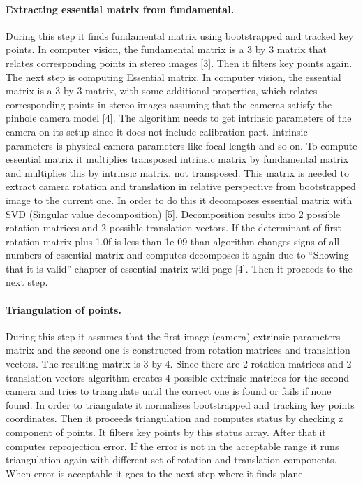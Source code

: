 \documentclass[../../main]{subfiles}
\begin{document}
\paragraph{Extracting essential matrix from fundamental.}
During this step it finds fundamental matrix using bootstrapped and tracked key points. In computer vision, the fundamental matrix is a 3 by 3 matrix that relates corresponding points in stereo images [3]. Then it filters key points again. The next step is computing Essential matrix. In computer vision, the essential matrix is a 3 by 3 matrix, with some additional properties, which relates corresponding points in stereo images assuming that the cameras satisfy the pinhole camera model [4]. The algorithm needs to get intrinsic parameters of the camera on its setup since it does not include calibration part. Intrinsic parameters is physical camera parameters like focal length and so on. To compute essential matrix it multiplies transposed intrinsic matrix by fundamental matrix and multiplies this by intrinsic matrix, not transposed. This matrix is needed to extract camera rotation and translation in relative perspective from bootstrapped image to the current one. In order to do this it decomposes essential matrix with SVD (Singular value decomposition) [5]. Decomposition results into 2 possible rotation matrices and 2 possible translation vectors. If the determinant of first rotation matrix plus 1.0f is less than 1e-09 than algorithm changes signs of all numbers of essential matrix and computes decomposes it again due to “Showing that it is valid” chapter of essential matrix wiki page [4]. Then it proceeds to the next step.

\paragraph{Triangulation of points.}
During this step it assumes that the first image (camera) extrinsic parameters matrix and the second one is constructed from rotation matrices and translation vectors. The resulting matrix is 3 by 4. Since there are 2 rotation matrices and 2 translation vectors algorithm creates 4 possible extrinsic matrices for the second camera and tries to triangulate until the correct one is found or fails if none found. In order to triangulate it normalizes bootstrapped and tracking key points coordinates. Then it proceeds triangulation and computes status by checking z component of points. It filters key points by this status array. After that it computes reprojection error. If the error is not in the acceptable range it runs triangulation again with different set of rotation and translation components. When error is acceptable it goes to the next step where it finds plane.
\end{document}
